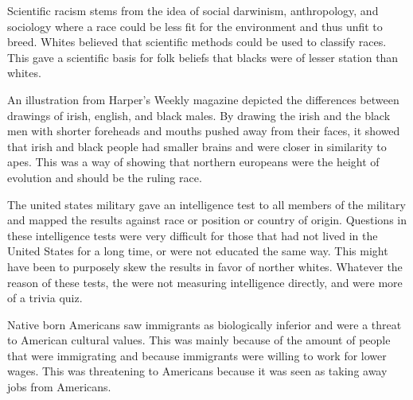 Scientific racism stems from the idea of social darwinism, anthropology, and sociology where a race could be less fit for the environment and thus unfit to breed.
Whites believed that scientific methods could be used to classify races.
This gave a scientific basis for folk beliefs that blacks were of lesser station than whites.

An illustration from Harper's Weekly magazine depicted the differences between drawings of irish, english, and black males.
By drawing the irish and the black men with shorter foreheads and mouths pushed away from their faces, it showed that irish and black people had smaller brains and were closer in similarity to apes.
This was a way of showing that northern europeans were the height of evolution and should be the ruling race.

The united states military gave an intelligence test to all members of the military and mapped the results against race or position or country of origin.
Questions in these intelligence tests were very difficult for those that had not lived in the United States for a long time, or were not educated the same way.
This might have been to purposely skew the results in favor of norther whites.
Whatever the reason of these tests, the were not measuring intelligence directly, and were more of a trivia quiz.

Native born Americans saw immigrants as biologically inferior and were a threat to American cultural values.
This was mainly because of the amount of people that were immigrating and because immigrants were willing to work for lower wages.
This was threatening to Americans because it was seen as taking away jobs from Americans.